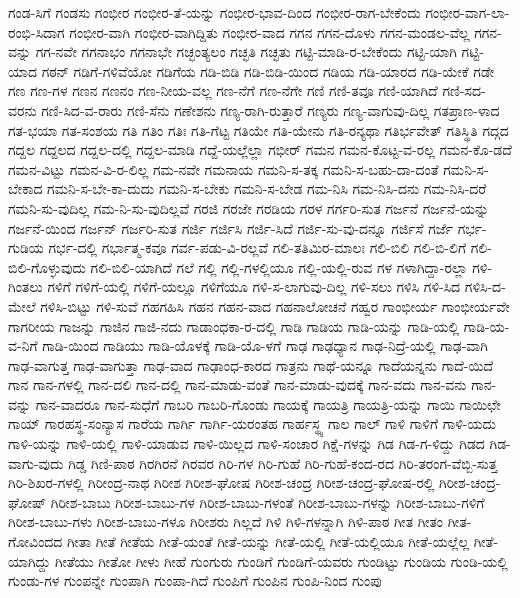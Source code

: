 {ಗಂಡ-ಸಿಗೆ
ಗಂಡಸು
ಗಂಭೀರ
ಗಂಭೀರ-ತೆ-ಯನ್ನು
ಗಂಭೀರ-ಭಾವ-ದಿಂದ
ಗಂಭೀರ-ರಾಗ-ಬೇಕೆಂದು
ಗಂಭೀರ-ವಾಗ-ಲಾ-ರಂಭಿ-ಸಿದಾಗ
ಗಂಭೀರ-ವಾಗಿ
ಗಂಭೀರ-ವಾಗಿದ್ದಿತು
ಗಂಭೀರ-ವಾದ
ಗಗನ
ಗಗನ-ದೊಳು
ಗಗನ-ಮಂಡಲ-ವೆಲ್ಲ
ಗಗನ-ವನ್ನು
ಗಗ-ನವೇ
ಗಗನಾಭಂ
ಗಗನಾಭೇ
ಗಚ್ಛಂತ್ಯಲಂ
ಗಚ್ಛತಿ
ಗಚ್ಛತು
ಗಟ್ಟಿ-ಮಾಡಿ-ರ-ಬೇಕೆಂದು
ಗಟ್ಟಿ-ಯಾಗಿ
ಗಟ್ಟಿ-ಯಾದ
ಗಠನ್
ಗಡಿಗೆ-ಗಳಿವೆಯೋ
ಗಡಿಗೆಯ
ಗಡಿ-ಬಿಡಿ
ಗಡಿ-ಬಿಡಿ-ಯಿಂದ
ಗಡಿಯ
ಗಡಿ-ಯಾರದ
ಗಡಿ-ಯೇಕೆ
ಗಡೇ
ಗಣ
ಗಣ-ಗಳ
ಗಣನ
ಗಣನಂ
ಗಣ-ನೀಯ-ವಲ್ಲ
ಗಣ-ನೆಗೆ
ಗಣ-ನೆಗೇ
ಗಣಿ
ಗಣಿ-ತವೂ
ಗಣಿ-ಯಾಗಿದೆ
ಗಣಿ-ಸದ-ವರನು
ಗಣಿ-ಸಿದ-ವ-ರಾರು
ಗಣಿ-ಸೆನು
ಗಣೇಶನು
ಗಣ್ಯ-ರಾಗಿ-ರುತ್ತಾರೆ
ಗಣ್ಯರು
ಗಣ್ಯ-ವಾಗುವು-ದಿಲ್ಲ
ಗತಪ್ರಾಣ-ಳಾದ
ಗತ-ಭಯಾ
ಗತ-ಸಂಶಯ
ಗತಿ
ಗತಿಂ
ಗತಿಃ
ಗತಿ-ಗೆಟ್ಟ
ಗತಿಯೇ
ಗತಿ-ಯೇನು
ಗತಿ-ರನ್ಯಥಾ
ಗತಿರ್ಭವೇತ್
ಗತಿಸ್ಥಿತಿ
ಗದ್ಗದ
ಗದ್ದಲ
ಗದ್ದಲದ
ಗದ್ದಲ-ದಲ್ಲಿ
ಗದ್ದಲ-ಮಾಡಿ
ಗದ್ದೆ-ಯಲ್ಲೆಲ್ಲಾ
ಗಭೀರ್
ಗಮನ
ಗಮನ-ಕೊಟ್ಟ-ವ-ರಲ್ಲ
ಗಮನ-ಕೊ-ಡದೆ
ಗಮನ-ವಿಟ್ಟು
ಗಮನ-ವಿ-ರ-ಲಿಲ್ಲ
ಗಮ-ನವೇ
ಗಮನಾಯ
ಗಮನಿ-ಸ-ತಕ್ಕ
ಗಮನಿ-ಸ-ಬಹು-ದಾ-ದಂತೆ
ಗಮನಿ-ಸ-ಬೇಕಾದ
ಗಮನಿ-ಸ-ಬೇ-ಕಾ-ದುದು
ಗಮನಿ-ಸ-ಬೇಕು
ಗಮನಿ-ಸ-ಬೇಡ
ಗಮ-ನಿಸಿ
ಗಮ-ನಿಸಿ-ದನು
ಗಮ-ನಿಸಿ-ದರೆ
ಗಮನಿ-ಸು-ವುದಿಲ್ಲ
ಗಮ-ನಿ-ಸು-ವುದಿಲ್ಲವೆ
ಗರಜಿ
ಗರಜೇ
ಗರಡಿಯ
ಗರಳ
ಗರ್ಗರಿ-ಸುತ
ಗರ್ಜನೆ
ಗರ್ಜನೆ-ಯನ್ನು
ಗರ್ಜನೆ-ಯಿಂದ
ಗರ್ಜನ್
ಗರ್ಜರಿ-ಸುತ
ಗರ್ಜಿ
ಗರ್ಜಿಸಿ
ಗರ್ಜಿ-ಸಿದೆ
ಗರ್ಜಿ-ಸು-ವು-ದನ್ನೂ
ಗರ್ಜಿಸೆ
ಗರ್ಜೆ
ಗರ್ಭ-ಗುಡಿಯ
ಗರ್ಭ-ದಲ್ಲಿ
ಗರ್ಭಾತ್ಮ-ಕವೂ
ಗರ್ವ-ಪಡು-ವಿ-ರಲ್ಲವೆ
ಗಲಿ-ತತಿಮಿರ-ಮಾಲಃ
ಗಲಿ-ಬಿಲಿ
ಗಲಿ-ಬಿ-ಲಿಗೆ
ಗಲಿ-ಬಿಲಿ-ಗೊಳ್ಳುವುದು
ಗಲಿ-ಬಿಲಿ-ಯಾಗಿದೆ
ಗಲೆ
ಗಲ್ಲಿ
ಗಲ್ಲಿ-ಗಳಲ್ಲಿಯೂ
ಗಲ್ಲಿ-ಯಲ್ಲಿ-ರುವ
ಗಳ
ಗಳಾಗಿದ್ದಾ-ರಲ್ಲಾ
ಗಳಿ-ಗಿಂತಲು
ಗಳಿಗೆ
ಗಳಿಗೆ-ಯಲ್ಲಿ
ಗಳಿಗೆ-ಯಲ್ಲೂ
ಗಳಿಗೆಯೂ
ಗಳಿ-ಸ-ಲಾಗುವು-ದಿಲ್ಲ
ಗಳಿ-ಸಲು
ಗಳಿಸಿ
ಗಳಿ-ಸಿದ
ಗಳಿಸಿ-ದ-ಮೇಲೆ
ಗಳಿಸಿ-ಬಿಟ್ಟು
ಗಳಿ-ಸುವೆ
ಗಹಗಹಿಸಿ
ಗಹನ
ಗಹನ-ವಾದ
ಗಹನಾಲೋಚನೆ
ಗಹ್ವರ
ಗಾಂಭೀರ್ಯ
ಗಾಂಭೀರ್ಯವೇ
ಗಾಗರೀಯ
ಗಾಜನ್ನು
ಗಾಜಿನ
ಗಾಜಿ-ನದು
ಗಾಡಾಂಧಕಾ-ರ-ದಲ್ಲಿ
ಗಾಡಿ
ಗಾಡಿಯ
ಗಾಡಿ-ಯನ್ನು
ಗಾಡಿ-ಯಲ್ಲಿ
ಗಾಡಿ-ಯ-ವ-ನಿಗೆ
ಗಾಡಿ-ಯಿಂದ
ಗಾಡಿಯು
ಗಾಡಿ-ಯೊಳಕ್ಕೆ
ಗಾಡಿ-ಯೊ-ಳಗೆ
ಗಾಢ
ಗಾಢಧ್ಯಾನ
ಗಾಢ-ನಿದ್ರೆ-ಯಲ್ಲಿ
ಗಾಢ-ವಾಗಿ
ಗಾಢ-ವಾಗುತ್ತ
ಗಾಢ-ವಾಗುತ್ತಾ
ಗಾಢ-ವಾದ
ಗಾಢಾಂಧ-ಕಾರದ
ಗಾತ್ರನು
ಗಾಥೆ-ಯನ್ನೂ
ಗಾದೆಯನ್ನನು
ಗಾದೆ-ಯಿದೆ
ಗಾನ
ಗಾನ-ಗಳಲ್ಲಿ
ಗಾನ-ದಲಿ
ಗಾನ-ದಲ್ಲಿ
ಗಾನ-ಮಾಡು-ವಂತೆ
ಗಾನ-ಮಾಡು-ವುದಕ್ಕೆ
ಗಾನ-ವದು
ಗಾನ-ವನು
ಗಾನ-ವನ್ನು
ಗಾನ-ವಾದರೂ
ಗಾನ-ಸುಧೆಗೆ
ಗಾಬರಿ
ಗಾಬರಿ-ಗೊಂಡು
ಗಾಯಕ್ಕೆ
ಗಾಯತ್ರಿ
ಗಾಯತ್ರಿ-ಯನ್ನು
ಗಾಯಿ
ಗಾಯಿಛೇ
ಗಾಯ್
ಗಾರಹಸ್ಥ-ಸಂನ್ಯಾಸ
ಗಾರೆಯ
ಗಾರ್ಗಿ
ಗಾರ್ಗಿ-ಯರಂತಹ
ಗಾರ್ಹಸ್ಥ್ಯ
ಗಾಲ
ಗಾಲ್
ಗಾಳಿ
ಗಾಳಿಗೆ
ಗಾಳಿ-ಯದು
ಗಾಳಿ-ಯನ್ನು
ಗಾಳಿ-ಯಲ್ಲಿ
ಗಾಳಿ-ಯಾಡುವ
ಗಾಳಿ-ಯಿಲ್ಲದ
ಗಾಳಿ-ಸಂಚಾರ
ಗಿಕ್ಷೆ-ಗಳನ್ನು
ಗಿಡ
ಗಿಡ-ಗ-ಳಿದ್ದು
ಗಿಡದ
ಗಿಡ-ವಾಗು-ವುದು
ಗಿಡ್ಡ
ಗಿಣಿ-ಪಾಠ
ಗಿರಗಿರನೆ
ಗಿರವರ
ಗಿರಿ-ಗಳ
ಗಿರಿ-ಗುಹೆ
ಗಿರಿ-ಗುಹೆ-ಕಂದ-ರದ
ಗಿರಿ-ತರಂಗ-ವೆಬ್ಬಿ-ಸುತ್ತ
ಗಿರಿ-ಶಿಖರ-ಗಳಲ್ಲಿ
ಗಿರೀಂದ್ರ-ನಾಥ
ಗಿರೀಶ
ಗಿರೀಶ-ಘೋಷ
ಗಿರೀಶ-ಚಂದ್ರ
ಗಿರೀಶ-ಚಂದ್ರ-ಘೋಷ-ರಲ್ಲಿ
ಗಿರೀಶ-ಚಂದ್ರ-ಘೋಷ್
ಗಿರೀಶ-ಬಾಬು
ಗಿರೀಶ-ಬಾಬು-ಗಳ
ಗಿರೀಶ-ಬಾಬು-ಗಳಂತೆ
ಗಿರೀಶ-ಬಾಬು-ಗಳನ್ನು
ಗಿರೀಶ-ಬಾಬು-ಗಳಿಗೆ
ಗಿರೀಶ-ಬಾಬು-ಗಳು
ಗಿರೀಶ-ಬಾಬು-ಗಳೂ
ಗಿರೀಶರು
ಗಿಲ್ಲದೆ
ಗಿಳಿ
ಗಿಳಿ-ಗಳನ್ನಾಗಿ
ಗಿಳಿ-ಪಾಠ
ಗೀತ
ಗೀತಂ
ಗೀತ-ಗೋವಿಂದದ
ಗೀತಾ
ಗೀತೆ
ಗೀತೆಯ
ಗೀತೆ-ಯಂತೆ
ಗೀತೆ-ಯನ್ನು
ಗೀತೆ-ಯಲ್ಲಿ
ಗೀತೆ-ಯಲ್ಲಿಯೂ
ಗೀತೆ-ಯಲ್ಲೆಲ್ಲ
ಗೀತೆ-ಯಾಗಿದ್ದು
ಗೀತೆಯು
ಗೀತೋ
ಗೀಳು
ಗೀಹೆ
ಗುಂಗುರು
ಗುಂಡಿಗೆ
ಗುಂಡಿಗೆ-ಯವರು
ಗುಂಡಿಟ್ಟು
ಗುಂಡಿಯ
ಗುಂಡಿ-ಯಲ್ಲಿ
ಗುಂಡು-ಗಳ
ಗುಂಪನ್ನೇ
ಗುಂಪಾಗಿ
ಗುಂಪಾ-ಗಿದೆ
ಗುಂಪಿಗೆ
ಗುಂಪಿನ
ಗುಂಪಿ-ನಿಂದ
ಗುಂಪು
}
